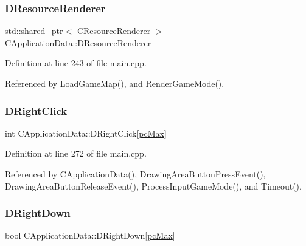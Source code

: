 \subsubsection{\texorpdfstring{D\+Resource\+Renderer}{DResourceRenderer}}
{\footnotesize\ttfamily std\+::shared\+\_\+ptr$<$ \hyperlink{classCResourceRenderer}{C\+Resource\+Renderer} $>$ C\+Application\+Data\+::\+D\+Resource\+Renderer\hspace{0.3cm}{\ttfamily [protected]}}



Definition at line 243 of file main.\+cpp.



Referenced by Load\+Game\+Map(), and Render\+Game\+Mode().

\hypertarget{classCApplicationData_a845b854113fb8742338ada01af8b9351}{}\label{classCApplicationData_a845b854113fb8742338ada01af8b9351} 
\subsubsection{\texorpdfstring{D\+Right\+Click}{DRightClick}}
{\footnotesize\ttfamily int C\+Application\+Data\+::\+D\+Right\+Click\mbox{[}\hyperlink{GameDataTypes_8h_aafb0ca75933357ff28a6d7efbdd7602fa594a5c8dd3987f24e8a0f23f1a72cd34}{pc\+Max}\mbox{]}\hspace{0.3cm}{\ttfamily [protected]}}



Definition at line 272 of file main.\+cpp.



Referenced by C\+Application\+Data(), Drawing\+Area\+Button\+Press\+Event(), Drawing\+Area\+Button\+Release\+Event(), Process\+Input\+Game\+Mode(), and Timeout().

\hypertarget{classCApplicationData_a0eb2ef18b6e71e98517f8b813a658164}{}\label{classCApplicationData_a0eb2ef18b6e71e98517f8b813a658164} 
\subsubsection{\texorpdfstring{D\+Right\+Down}{DRightDown}}
{\footnotesize\ttfamily bool C\+Application\+Data\+::\+D\+Right\+Down\mbox{[}\hyperlink{GameDataTypes_8h_aafb0ca75933357ff28a6d7efbdd7602fa594a5c8dd3987f24e8a0f23f1a72cd34}{pc\+Max}\mbox{]}\hspace{0.3cm}{\ttfamily [protected]}}



